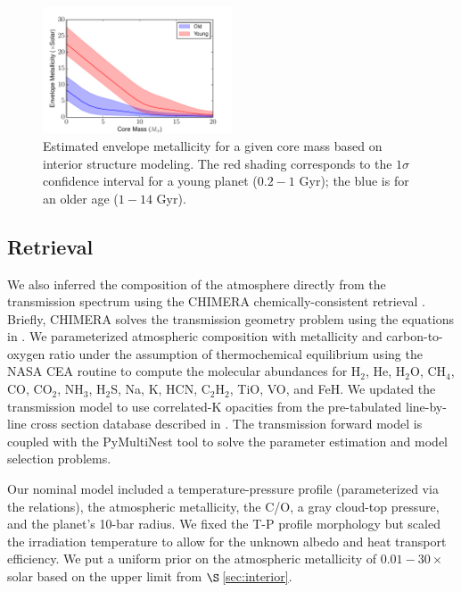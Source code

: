 \documentclass[twocolumn, trackchanges]{aastex61}
\begin{document}
\begin{figure}
\includegraphics[width = 0.5\textwidth]{fig3_metallicity.pdf}
\caption{Estimated envelope metallicity for a given core mass based on interior structure modeling. The red shading corresponds to the $1\sigma$ confidence interval for a young planet ($0.2-1$ Gyr); the blue is for an older age ($1-14$ Gyr).}
\label{fig:metal_prior}
\end{figure}

\subsection{Retrieval}
\label{sec:retrieval}
We also inferred the composition of the atmosphere directly from the transmission spectrum using the CHIMERA chemically-consistent retrieval \citep{line13a}.   Briefly, CHIMERA solves the transmission geometry problem using the equations in \cite{brown01, tinetti12}.  We parameterized atmospheric composition with metallicity and carbon-to-oxygen ratio under the assumption of thermochemical equilibrium using the NASA CEA routine \citep{gordon94} to compute the molecular abundances for H$_2$, He, H$_2$O, CH$_4$, CO, CO$_2$, NH$_3$, H$_2$S, Na, K, HCN, C$_2$H$_2$, TiO, VO, and FeH.    We updated the transmission model to use correlated-K opacities \citep{lacis91, molliere15, amundsen16} from the pre-tabulated line-by-line cross section database described in \cite{freedman14}. The transmission forward model is coupled with the PyMultiNest tool \citep{buchner16} to solve the parameter estimation and model selection problems.  

Our nominal model included a temperature-pressure profile (parameterized via the \citealt{guillot10} relations), the atmospheric metallicity, the C/O, a gray cloud-top pressure, and the planet's 10-bar radius.  We fixed the T-P profile morphology but scaled the irradiation temperature to allow for the unknown albedo and heat transport efficiency.  We put a uniform prior on the atmospheric metallicity of $0.01 - 30\times$ solar based on the upper limit from $\S$\,\ref{sec:interior}.  
\end{document}
